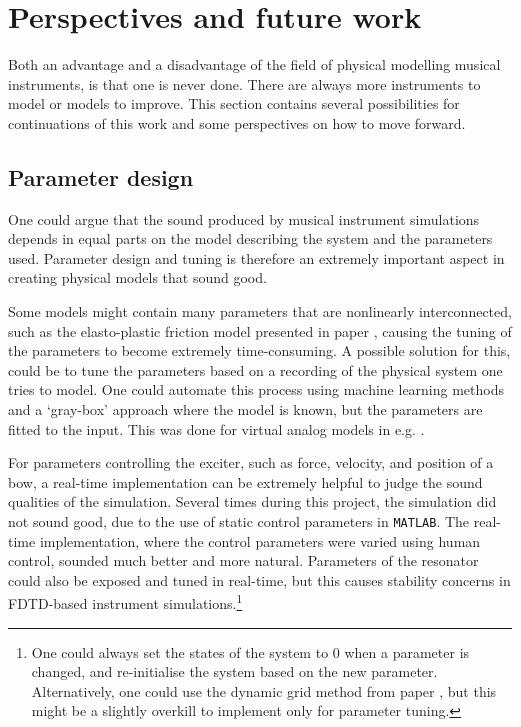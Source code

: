 

\section{Perspectives and future work}
Both an advantage and a disadvantage of the field of physical modelling musical instruments, is that one is never done. There are always more instruments to model or models to improve. This section contains several possibilities for continuations of this work and some perspectives on how to move forward.

\subsection{Parameter design}\label{sec:parameterDesign}
One could argue that the sound produced by musical instrument simulations depends in equal parts on the model describing the system and the parameters used. Parameter design and tuning is therefore an extremely important aspect in creating physical models that sound good. 

Some models might contain many parameters that are nonlinearly interconnected, such as the elasto-plastic friction model presented in paper \citeP[C], causing the tuning of the parameters to become extremely time-consuming. A possible solution for this, could be to tune the parameters based on a recording of the physical system one tries to model. 
One could automate this process using machine learning methods and a `gray-box' approach where the model is known, but the parameters are fitted to the input. This was done for virtual analog models in e.g. \cite{Eichas2017, Parker2019}. 

For parameters controlling the exciter, such as force, velocity, and position of a bow, a real-time implementation can be extremely helpful to judge the sound qualities of the simulation. Several times during this project, the simulation did not sound good, due to the use of static control parameters in \texttt{MATLAB}. The real-time implementation, where the control parameters were varied using human control, sounded much better and more natural. Parameters of the resonator could also be exposed and tuned in real-time, but this causes stability concerns in FDTD-based instrument simulations.\footnote{One could always set the states of the system to 0 when a parameter is changed, and re-initialise the system based on the new parameter. Alternatively, one could use the dynamic grid method from paper \citeP[G], but this might be a slightly overkill to implement only for parameter tuning.}

